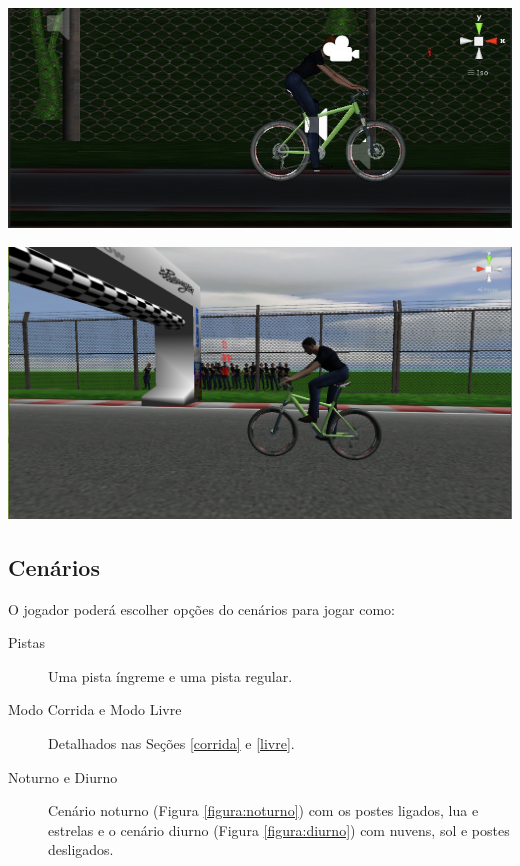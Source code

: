 \begin{center}
	\includegraphics[scale=0.4]{figuras/mulher}
	\label{figura:mulher}
\end{center}

\begin{center}
	\includegraphics[scale=0.4]{figuras/homem}
	\label{figura:homem}
\end{center}

\subsection{Cenários}

O jogador poderá escolher opções do cenários para jogar como:

\begin{description}
\item[Pistas] Uma pista íngreme e uma pista regular.
\item[Modo Corrida e Modo Livre] Detalhados nas Seções \ref{corrida} e \ref{livre}.
\item[Noturno e Diurno] Cenário noturno (Figura \ref{figura:noturno}) com os postes ligados, lua e estrelas e o cenário diurno (Figura \ref{figura:diurno}) com nuvens, sol e postes desligados.
\end{description}

